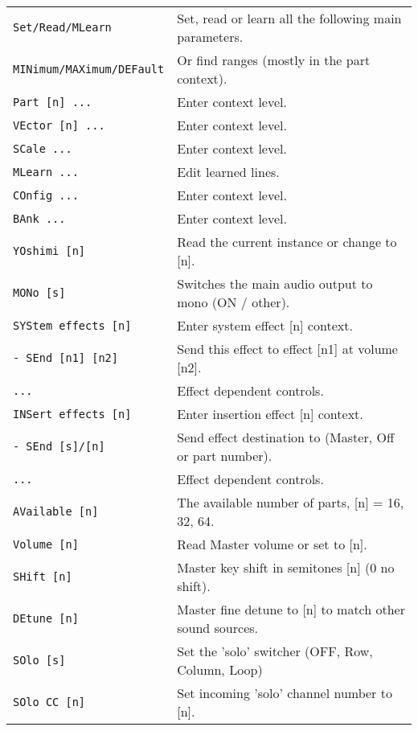 \begin{center}
\begin{longtable}{p{6cm} p{10cm}}
\texttt{Set/Read/MLearn} &
   Set, read or learn all the following main parameters. \\
\texttt{MINimum/MAXimum/DEFault} &
   Or find ranges (mostly in the part context). \\
   \texttt{Part [n] ...} &
   Enter context level. \\
\texttt{VEctor [n] ...} &
   Enter context level. \\
\texttt{SCale ...} &
   Enter context level. \\
\texttt{MLearn ...} &
   Edit learned lines. \\
\texttt{COnfig ...} &
   Enter context level. \\
\texttt{BAnk ...} &
   Enter context level. \\


\texttt{YOshimi [n]} &
   Read the current instance or change to [n]. \\
\texttt{MONo [s]} &
   Switches the main audio output to mono (ON / other). \\

\texttt{SYStem effects [n]} &
   Enter system effect [n] context. \\
\texttt{- SEnd [n1] [n2]} &
   Send this effect to effect [n1] at volume [n2]. \\
\texttt{...} &
   Effect dependent controls. \\
\texttt{INSert effects [n]} &
   Enter insertion effect [n] context. \\
\texttt{- SEnd [s]/[n]} &
   Send effect destination to (Master, Off or part number). \\
\texttt{...} &
   Effect dependent controls. \\

\texttt{AVailable [n]} &
   The available number of parts, [n] = 16, 32, 64. \\
\texttt{Volume [n]} &
   Read Master volume or set to [n]. \\
\texttt{SHift [n]} &
   Master key shift in semitones [n] (0 no shift). \\
\texttt{DEtune [n]} &
   Master fine detune to [n] to match other sound sources. \\
\texttt{SOlo [s]} &
   Set the 'solo' switcher (OFF, Row, Column, Loop) \\
\texttt{SOlo CC [n]} &
   Set incoming 'solo' channel number to [n]. \\

\end{longtable}
\end{center}

